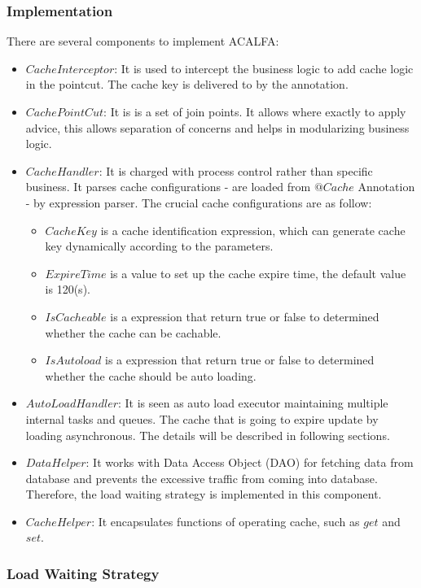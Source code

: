 \documentclass{singlecol-new}
\theoremstyle{TH}{
\newtheorem{lemma}{Lemma}
\newtheorem{theorem}[lemma]{Theorem}
\newtheorem{corrolary}[lemma]{Corrolary}
\newtheorem{conjecture}[lemma]{Conjecture}
\newtheorem{proposition}[lemma]{Proposition}
\newtheorem{claim}[lemma]{Claim}
\newtheorem{stheorem}[lemma]{Wrong Theorem}
}
\theoremstyle{THrm}{
\newtheorem{definition}{Definition}[section]
\newtheorem{question}{Question}[section]
\newtheorem{remark}{Remark}
\newtheorem{scheme}{Scheme}
}
\theoremstyle{THhit}{
\newtheorem{case}{Case}[section]
}
\begin{document}
\subsubsection{Implementation}
There are several components to implement ACALFA:

\begin{itemize}
    \item $CacheInterceptor$: It is used to intercept the business logic to add cache logic in the pointcut. The cache key is delivered to by the annotation.
    \item $CachePointCut$: It is is a set of join points. It allows where exactly to apply advice, this allows separation of concerns and helps in modularizing business logic.
    \item $CacheHandler$: It is charged with process control rather than specific business. It parses cache configurations - are loaded from $@Cache$ Annotation - by expression parser. The crucial cache configurations are as follow:
    \begin{itemize}
        \item $CacheKey$ is a cache identification expression, which can generate cache key dynamically according to the parameters.
        \item $ExpireTime$ is a value to set up the cache expire time, the default value is 120(s).
        \item $IsCacheable$ is a expression that return true or false to determined whether the cache can be cachable.
        \item $IsAutoload$ is a expression that return true or false to determined whether the cache should be auto loading.
    \end{itemize}
    \item $AutoLoadHandler$: It is seen as auto load executor maintaining multiple internal tasks and queues. The cache that is going to expire update by loading asynchronous. The details will be described in following sections.
    \item $DataHelper$: It works with Data Access Object (DAO) for fetching data from database and prevents the excessive traffic from coming into database. Therefore, the load waiting strategy is implemented in this component.
    \item $CacheHelper$: It encapsulates functions of operating cache, such as $get$ and $set$.
\end{itemize}

\subsubsection{Load Waiting Strategy}
\end{document}
